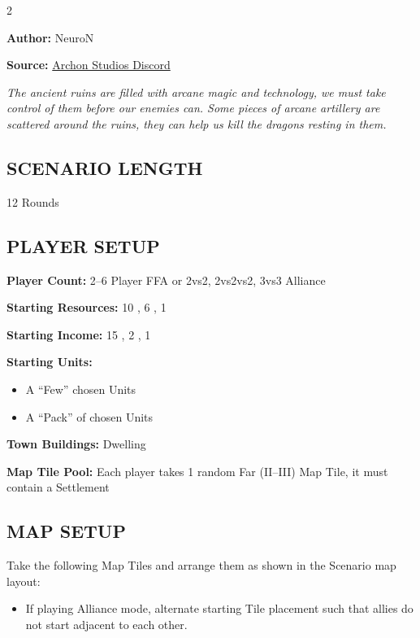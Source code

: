 
\begin{multicols}{2}

\textbf{Author:} NeuroN

\textbf{Source:} \href{https://discord.com/channels/740870068178649108/1279029213839626313}{Archon Studios Discord}

\textit{The ancient ruins are filled with arcane magic and technology, we must take control of them before our enemies can.
Some pieces of arcane artillery are scattered around the ruins, they can help us kill the dragons resting in them.}

\subsection*{\MakeUppercase{Scenario Length}}
12 Rounds

\subsection*{\MakeUppercase{Player Setup}}
\textbf{Player Count:} 2--6 Player FFA or 2vs2, 2vs2vs2, 3vs3 Alliance

\textbf{Starting Resources:} 10 , 6 , 1 

\textbf{Starting Income:} 15 , 2 , 1 

\textbf{Starting Units:}
\begin{itemize}
  \item A ``Few'' chosen  Units
  \item A ``Pack'' of chosen  Units
\end{itemize}

\textbf{Town Buildings:}  Dwelling

\textbf{Map Tile Pool:} Each player takes 1 random Far (II--III) Map Tile, it must contain a Settlement

\subsection*{\MakeUppercase{Map Setup}}
Take the following Map Tiles and arrange them as shown in the Scenario map layout:

\begin{itemize}
  \item If playing Alliance mode, alternate starting Tile placement such that allies do not start adjacent to each other.
\end{itemize}


\end{multicols}
